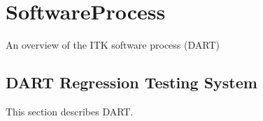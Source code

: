 \chapter{SoftwareProcess}

An overview of the ITK software process (DART)

\section{DART Regression Testing System}
\label{sec:DART}

This section describes DART.

